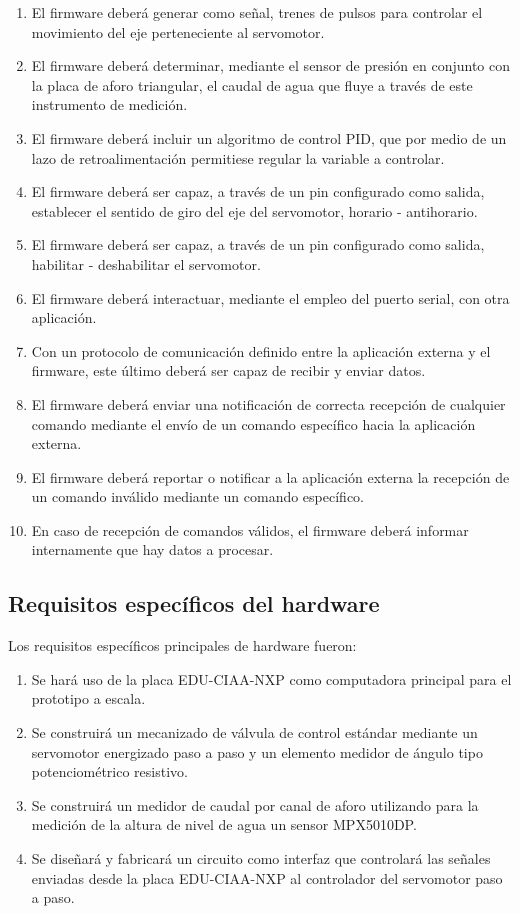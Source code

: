 \begin{enumerate}
	\item El firmware deberá generar como señal, trenes de pulsos para controlar el movimiento del eje perteneciente al servomotor.
	\item El firmware deberá determinar, mediante el sensor de presión en conjunto con la placa de aforo triangular, el caudal de agua que fluye a través de este instrumento de medición.
	\item  El firmware deberá incluir un algoritmo de control PID, que por medio de un lazo de retroalimentación permitiese regular la variable a controlar.
	\item El firmware deberá ser capaz, a través de un pin configurado como salida, establecer el sentido de giro del eje del servomotor, horario - antihorario.
	\item El firmware deberá ser capaz, a través de un pin configurado como salida, habilitar - deshabilitar el servomotor.
	\item El firmware deberá interactuar, mediante el empleo del puerto serial, con otra aplicación. 	  
	\item Con un protocolo de comunicación definido entre la aplicación externa y el firmware, este último deberá ser capaz de recibir y enviar datos.
	\item El firmware deberá enviar una notificación de correcta recepción de cualquier comando mediante el envío de un comando específico hacia la aplicación externa.  
	\item El firmware deberá reportar o notificar a la aplicación externa la recepción de un comando inválido mediante un comando específico.
	\item En caso de recepción de comandos válidos, el firmware deberá informar internamente que hay datos a procesar. 
\end{enumerate}

\subsection{Requisitos específicos del hardware}
\label{subsec:requisitoshw}
 Los requisitos específicos principales de hardware fueron:
\begin{enumerate}
	\item Se hará uso de la placa EDU-CIAA-NXP como computadora principal para el prototipo a escala.
	\item Se construirá un mecanizado de  válvula de control estándar mediante un servomotor energizado paso a paso y un elemento medidor de ángulo tipo potenciométrico resistivo.
	\item Se construirá un medidor de caudal por canal de aforo utilizando para la medición de la altura de nivel de agua un sensor MPX5010DP.
	\item Se diseñará y fabricará un circuito como interfaz que controlará las señales enviadas desde la placa EDU-CIAA-NXP al controlador del servomotor paso a paso. 
\end{enumerate}

